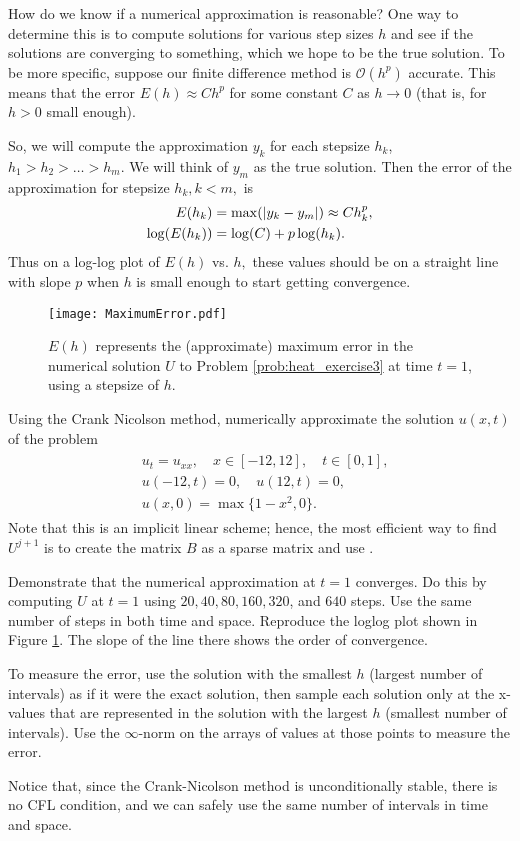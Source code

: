 How do we know if a numerical approximation is reasonable?
One way to determine this is to compute solutions for various step sizes $h$ and see if the solutions are converging to something, which we hope to be the true solution.
To be more specific, suppose our finite difference method is $\mathcal{O}(h^p)$ accurate.
This means that the error $E(h) \approx Ch^p$ for some constant $C$ as $h \to 0$ (that is, for $h>0$ small enough).

So, we will compute the approximation $y_k$ for each stepsize $h_k$, $h_1 > h_2> \ldots>h_m.$
We will think of $y_m$ as the true solution.
Then the error of the approximation for stepsize $h_k, k < m,$ is
\begin{align*}
	E(h_k) &= \max( \left\lvert y_k - y_m\right\rvert) \approx C h_k^p ,\\
	\log(E(h_k)) &= \log(C) + p \log(h_k).
\end{align*}
Thus on a log-log plot of $E(h)$ vs. $h,$ these values should be on a straight line with slope $p$ when $h$ is small enough to start getting convergence.

\begin{figure}
\centering
\texttt{[image: MaximumError.pdf]}
\caption{$E(h)$ represents the (approximate) maximum error in the numerical solution $U$ to Problem \ref{prob:heat_exercise3} at time $t=1$, using a stepsize of $h$.}
\label{fig:heatexercise3}
\end{figure}

\begin{problem}
\label{prob:heat_exercise3}
Using the Crank Nicolson method, numerically approximate the solution $u(x,t)$ of the problem
\begin{align}
	\begin{split}
	&{ } u_t = u_{xx}, \quad x \in [-12,12],\quad t \in [0,1],\\
	&{ } u(-12,t) = 0,\quad u(12,t) = 0,\\
	&{ } u(x,0) = \max\{1 - x^2,0\}.
	\end{split}
\end{align}
Note that this is an implicit linear scheme; hence, the most efficient way to find \(U^{j+1}\) is to create the matrix \(B\) as a sparse matrix and use .

Demonstrate that the numerical approximation at $t = 1$ converges.
Do this by computing $U$ at $t=1$ using $20,40,80,160,320$, and $640$ steps.
Use the same number of steps in both time and space.
Reproduce the loglog plot shown in Figure \ref{fig:heatexercise3}.
The slope of the line there shows the order of convergence.

To measure the error, use the solution with the smallest $h$ (largest number of intervals) as if it were the exact solution, then sample each solution only at the x-values that are represented in the solution with the largest $h$ (smallest number of intervals).
Use the $\infty$-norm on the arrays of values at those points to measure the error.

Notice that, since the Crank-Nicolson method is unconditionally stable, there is no CFL condition, and we can safely use the same number of intervals in time and space.
\end{problem}
